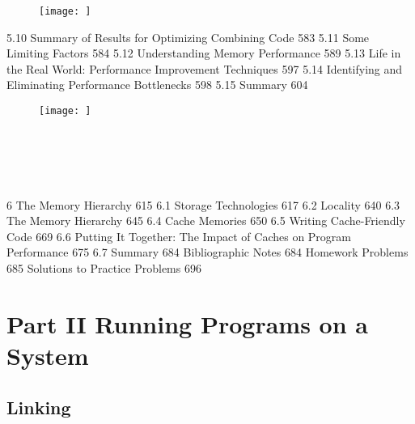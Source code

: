 \begin{figure}[h!]
    \centering
    \texttt{[image: ]}
    \caption{}
\end{figure}


5.10 Summary of Results for Optimizing Combining Code 583
5.11 Some Limiting Factors 584
5.12 Understanding Memory Performance 589
5.13 Life in the Real World: Performance Improvement Techniques 597
5.14 Identifying and Eliminating Performance Bottlenecks 598
5.15 Summary 604


\begin{figure}[h!]
    \centering
    \texttt{[image: ]}
    \caption{}
\end{figure}

\begin{lstlisting}[style = CStyle]
\end{lstlisting}

\begin{lstlisting}[style = CStyle]
\end{lstlisting}

\begin{lstlisting}[style = CStyle]
\end{lstlisting}

\begin{lstlisting}[style = CStyle]
\end{lstlisting}

\begin{lstlisting}[style = CStyle]
\end{lstlisting}

\begin{lstlisting}[style = CStyle]
\end{lstlisting}


6
The Memory Hierarchy 615
6.1 Storage Technologies 617
6.2 Locality 640
6.3 The Memory Hierarchy 645
6.4 Cache Memories 650
6.5 Writing Cache-Friendly Code 669
6.6 Putting It Together: The Impact of Caches on Program Performance 675
6.7 Summary 684
Bibliographic Notes 684
Homework Problems 685
Solutions to Practice Problems 696



\chapter{Part II Running Programs on a System}

\section{Linking}

